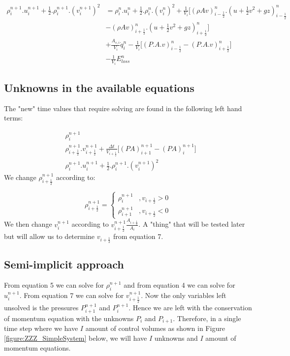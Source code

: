 \documentclass[11pt,letterpaper,titlepage]{article}
\newcommand{\half}{\frac{1}{2}}
\begin{document}
\begin{equation}
\begin{aligned}
\rho_i^{n+1}.u_i^{n+1} + \half.\rho_i^{n+1}.(v_i^{n+1})^2 &=\rho_i^{n}.u_i^{n} +\half.\rho_i^{n}.(v_i^{n})^2+ \frac{1}{V_i}\biggr[ (\rho Av)_{i-\half}^n.(u+\half v^2+gz)_{i-\half}^n \\
&- (\rho Av)_{i+\half}^n.(u+\half v^2+gz)_{i+\half}^n \biggr] \\
&+\frac{A_{s,i}}{V_i}\dot{q}_i^n - \frac{1}{V_i}\biggr[   (P.A.v)_{i-\half}^n - (P.A.v)_{i+\half}^n   \biggr] \\
&- \frac{1}{V_i}E_{loss}^n
\end{aligned}
\end{equation}






\subsection{Unknowns in the available equations}
The "new" time values that require solving are found in the following left hand terms:

\begin{equation*}
\begin{aligned}
&\rho_i^{n+1} \\
&\rho_{i+\half}^{n+1}.v_{i+\half}^{n+1} +\frac{\Delta t}{V_{i+\half}} \biggr[   (PA)_{i+1}^{n+1}-(PA)_{i}^{n+1}  \biggr]    \\
&\rho_i^{n+1}.u_i^{n+1} + \half.\rho_i^{n+1}.(v_i^{n+1})^2
\end{aligned}
\end{equation*}
\newline
We change $\rho_{i+\half}^{n+1}$ according to:

\begin{equation*}
\rho_{i+\half}^{n+1}=
\begin{cases}
\rho_{i}^{n+1}       &, v_{i+\half}>0 \\
\rho_{i+1}^{n+1}     &, v_{i+\half}<0
\end{cases}
\end{equation*}
\newline
We then change $v_i^{n+1}$ according to $v_{i+\half}^{n+1}\frac{A_{i+\half}}{A_i}$. A "thing" that will be tested later but will allow us to determine $v_{i+\half}$ from equation 7.




\subsection{Semi-implicit approach}
From equation 5 we can solve for $\rho_i^{n+1}$ and from equation 4 we can solve for $u_i^{n+1}$. From equation 7 we can solve for $v_{i+\half}^{n+1}$. Now the only variables left unsolved is the pressures $P_{i+1}^{n+1}$ and $P_{i}^{n+1}$.
\newline
\newline
Hence we are left with the conservation of momentum equation with the unknowns $P_{i}$ and $P_{i+1}$. Therefore, in a single time step where we have $I$ amount of control volumes as shown in Figure \ref{figure:ZZZ_SimpleSystem} below, we will have $I$ unknowns and $I$ amount of momentum equations. 
\end{document}
